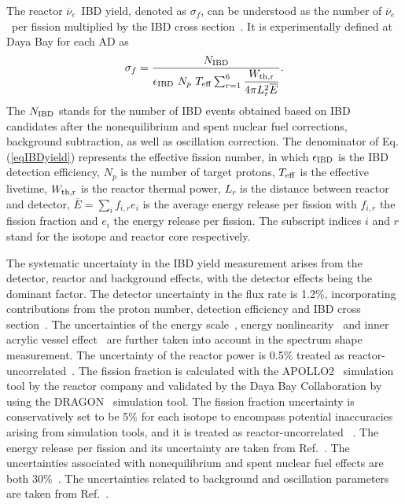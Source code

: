 \documentclass[aps,prl,showpacs,showkeys,amsmath,amssymb,twocolumn,floatfix,superscriptaddress,nofootinbib]{revtex4-1}
\newcommand{\Rnu}{$\overline{\nu}_e$}
\begin{document}
The reactor \Rnu\ IBD yield, denoted as $\sigma_f$, can be understood as the number of \Rnu\ per fission multiplied by the IBD cross section~\cite{IBD_Xsection_Vogel}.
It is experimentally defined at Daya Bay for each AD as
\begin{eqnarray}
\sigma_{f} = \dfrac{N_{\rm{IBD}}}{\epsilon_{\rm{IBD}}\ N_{p}\ T_{\rm{eff}} \sum_{r=1}^{6} \dfrac{W_{\rm{th},r}}{4\pi L^2_{r} \overline{E} }}.
\label{eqIBDyield}
\end{eqnarray}
The ${N_{\rm{IBD}}}$ stands for the number of IBD events obtained based on IBD candidates after the nonequilibrium and spent nuclear fuel corrections, background subtraction, as well as oscillation correction.
The denominator of Eq.(\ref{eqIBDyield}) represents the effective fission number, in which
$\epsilon_{\rm{IBD}}$ is the IBD detection efficiency,
${N}_{p}$ is the number of target protons,
${T}_{\rm{eff}}$ is the effective livetime,
${W}_{\rm{th},r}$ is the reactor thermal power,
${L}_{r}$ is the distance between reactor and detector,
$\overline{E} = \sum_{i}^{} f_{i,r} e_{i}$ is the average energy release per fission with
${f}_{i,r}$ the fission fraction
and ${e}_{i}$ the energy release per fission.
The subscript indices $i$ and $r$ stand for the isotope and reactor core respectively.

The systematic uncertainty in the IBD yield measurement arises from the detector, reactor and background effects, with the detector effects being the dominant factor.
The detector uncertainty in the flux rate is 1.2$\%$, incorporating contributions from the proton number, detection efficiency and IBD cross section~\cite{DayaBay_PRD_flux2019}.
The uncertainties of the energy scale~\cite{DYB_PRL_osc_2018}, energy nonlinearity~\cite{DYB_nonlinearity} and inner acrylic vessel effect~\cite{DayaBay_CPC_2016} are further taken into account in the spectrum shape measurement.
The uncertainty of the reactor power is 0.5$\%$ treated as reactor-uncorrelated~\cite{DayaBay_CPC_2016}.
The fission fraction is calculated with the APOLLO2~\cite{Apollo1988} simulation tool by the reactor company and validated by the Daya Bay Collaboration by using the DRAGON~\cite{Dragon} simulation tool.
The fission fraction uncertainty is conservatively set to be 5$\%$ for each isotope to encompass potential inaccuracies arising from simulation tools,
and it is treated as reactor-uncorrelated ~\cite{DayaBay_CPC_2016, An_thesis, Ma_FF_2014, Ma_FF_2017, Apollo2010, Djurcic:2008ny}.
The energy release per fission and its uncertainty are taken from Ref.~\cite{PRC_fission_energy}.
The uncertainties associated with nonequilibrium and spent nuclear fuel effects are both 30$\%$~\cite{DayaBay_CPC_2016, DYB_PRL_osc_2018}.
The uncertainties related to background and oscillation parameters are taken from Ref.~\cite{DayaBay_final_theta13}.
\end{document}

